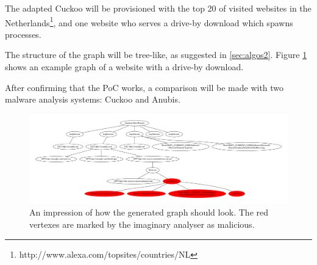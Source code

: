 The adapted Cuckoo will be provisioned with the top 20 of visited websites in the Netherlands\footnote{http://www.alexa.com/topsites/countries/NL}, and one website who serves a drive-by download which spawns processes.

The structure of the graph will be tree-like, as suggested in \ref{sec:algos2}. Figure \ref{fig:alg_tree} shows an example graph of a website with a drive-by download.

After confirming that the PoC works, a comparison will be made with two malware analysis systems: Cuckoo and Anubis.

\begin{figure}[h]
    \centering
    \centerline{\includegraphics[width=19cm]{Images/alg_tree}}
    \caption{An impression of how the generated graph should look. The red vertexes are marked by the imaginary analyser as malicious.}
    \label{fig:alg_tree}
\end{figure}

